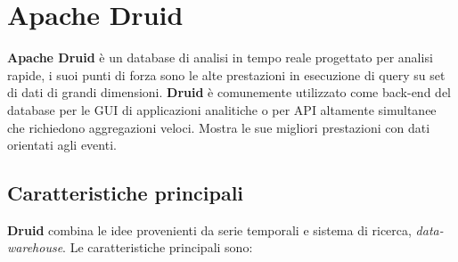 \documentclass{article}
\begin{document}
\section{Apache Druid}
\textbf{Apache Druid} è un database di analisi in tempo reale progettato per analisi rapide, i suoi punti di forza sono le alte prestazioni in esecuzione di query su set di dati di grandi dimensioni.
\textbf{Druid} è comunemente utilizzato come back-end del database per le GUI di applicazioni analitiche o per API altamente simultanee che richiedono aggregazioni veloci. Mostra le sue migliori prestazioni con dati orientati agli eventi.
\subsection{Caratteristiche principali}
\textbf{Druid} combina le idee provenienti da serie temporali e sistema di ricerca, \textit{data-warehouse}.
Le caratteristiche principali sono:
\end{document}
